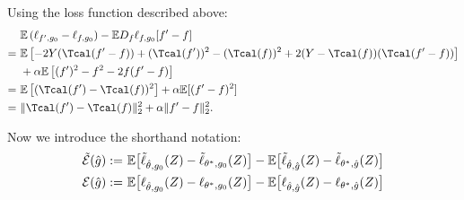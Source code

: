 \documentclass[12pt]{extarticle} %
\newcommand{\E}{\mathbb{E}}
\newcommand{\error}{\ensuremath{\textsc{Error}}}
\begin{document}
Using the loss function described above:
\begin{align*}
    ~&\E\left(\ell_{f', g_0} - \ell_{f, g_0}\right)  - \E D_{f}\ell_{f, g_0}[f'-f] \\=~& \mathbb{E}\left[-2Y(\Tcal(f'-f)) + (\Tcal(f'))^2 - (\Tcal(f))^2 + 2(Y-\Tcal(f))(\Tcal(f'-f))\right]\\
    ~&+ \alpha \mathbb{E}\left[(f')^2 - f^2 -2f(f'-f) \right]\\
    =~& \mathbb{E}\left[(\Tcal(f') - \Tcal(f))^2\right] + \alpha \mathbb{E}[(f'-f)^2] \\
    =~& \|\Tcal(f') - \Tcal(f)\|_{2}^{2} + \alpha \|f'-f\|_{2}^{2}.
\end{align*}

Now we introduce the shorthand notation:
\begin{align*}
    \tilde{{\cal E}}(\hat{g}) :=~& \E\big[\tilde{\ell}_{\hat{\theta},g_0}(Z) - \tilde{\ell}_{\theta^*,g_0}(Z)\big] - \E\big[\tilde{\ell}_{\hat{\theta},\hat{g}}(Z) - \tilde{\ell}_{\theta^*,\hat{g}}(Z)\big]\\
    {\cal E}(\hat{g}) :=~& \E\big[{\ell}_{\hat{\theta},g_0}(Z) - {\ell}_{\theta^*,g_0}(Z)\big] - \E\big[{\ell}_{\hat{\theta},\hat{g}}(Z) - {\ell}_{\theta^*,\hat{g}}(Z)\big]
\end{align*}
\end{document}
